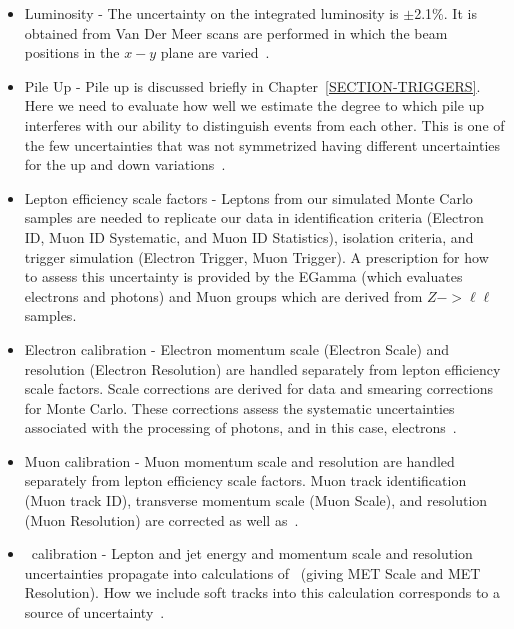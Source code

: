 \begin{itemize}

\item Luminosity - The uncertainty on the integrated luminosity is $\pm$2.1\%. It is obtained from Van Der Meer scans are performed in which the beam positions in the $x-y$ plane are varied~\cite{Balagura:2011yw,Aad:2013ucp}.

\item Pile Up - Pile up is discussed briefly in Chapter~\ref{SECTION-TRIGGERS}. Here we need to evaluate how well we estimate the degree to which pile up interferes with our ability to distinguish events from each other. This is one of the few uncertainties that was not symmetrized having different uncertainties for the up and down variations~\cite{JETUNCERTAINTIES}. 

\item Lepton efficiency scale factors - Leptons from our simulated Monte Carlo samples are needed to replicate our data in identification criteria (Electron ID, Muon ID Systematic, and Muon ID Statistics), isolation criteria, and trigger simulation (Electron Trigger, Muon Trigger). A prescription for how to assess this uncertainty is provided by the EGamma (which evaluates electrons and photons) and Muon groups which are derived from $Z->\ell\ell$ samples.~\cite{ELECTRON-RECO,muonSFWiki}

\item Electron calibration - Electron momentum scale (Electron Scale) and resolution (Electron Resolution) are handled separately from lepton efficiency scale factors. Scale corrections are derived for data and smearing corrections for Monte Carlo. These corrections assess the systematic uncertainties associated with the processing of photons, and in this case, electrons~\cite{Fayard:2060328}. %

\item Muon calibration - Muon momentum scale and resolution are handled separately from lepton efficiency scale factors. Muon track identification (Muon track ID), transverse momentum scale (Muon Scale), and resolution (Muon Resolution) are corrected as well as~\cite{muonSFWiki}. %

\item \met~calibration - Lepton and jet energy and momentum scale and resolution uncertainties propagate into calculations of \met~(giving MET Scale and MET Resolution). How we include soft tracks into this calculation corresponds to a source of uncertainty~\cite{METWiki}.


\end{itemize}
